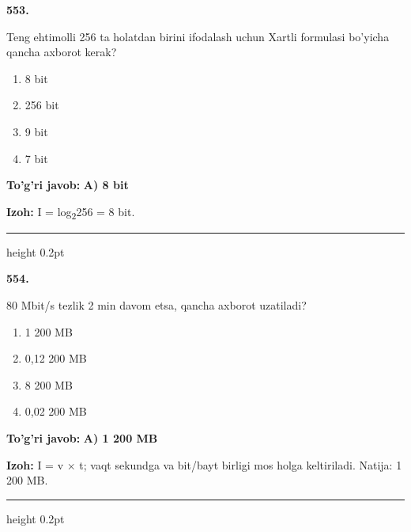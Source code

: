 \documentclass[10pt,a4paper,oneside]{article}
\begin{document}
\noindent\textbf{\color{ink}553.}
\par
Teng ehtimolli 256 ta holatdan birini ifodalash uchun Xartli formulasi bo'yicha qancha axborot kerak?
\begin{enumerate}[label=\Alph*),leftmargin=9mm]
\item 8 bit
\item 256 bit
\item 9 bit
\item 7 bit
\end{enumerate}
\begin{tcolorbox}[enhanced,breakable,colback=teal!4,colframe=teal!50!black,boxrule=0.5pt,arc=1.1mm,left=3mm,right=3mm,top=1.7mm,bottom=1.7mm,before skip=2mm,after skip=2mm]
\textbf{\color{teal}To'g'ri javob:} \textbf{A) 8 bit}
\par\smallskip
\textbf{Izoh:} I = log\textsubscript{2}256 = 8 bit.
\end{tcolorbox}
\vspace{2mm}\hrule height 0.2pt \vspace{3mm}

\noindent\textbf{\color{ink}554.}
\par
80 Mbit/s tezlik 2 min davom etsa, qancha axborot uzatiladi?
\begin{enumerate}[label=\Alph*),leftmargin=9mm]
\item 1 200 MB
\item 0,12 200 MB
\item 8 200 MB
\item 0,02 200 MB
\end{enumerate}
\begin{tcolorbox}[enhanced,breakable,colback=teal!4,colframe=teal!50!black,boxrule=0.5pt,arc=1.1mm,left=3mm,right=3mm,top=1.7mm,bottom=1.7mm,before skip=2mm,after skip=2mm]
\textbf{\color{teal}To'g'ri javob:} \textbf{A) 1 200 MB}
\par\smallskip
\textbf{Izoh:} I = v \ensuremath{\times} t; vaqt sekundga va bit/bayt birligi mos holga keltiriladi. Natija: 1 200 MB.
\end{tcolorbox}
\vspace{2mm}\hrule height 0.2pt \vspace{3mm}
\end{document}
